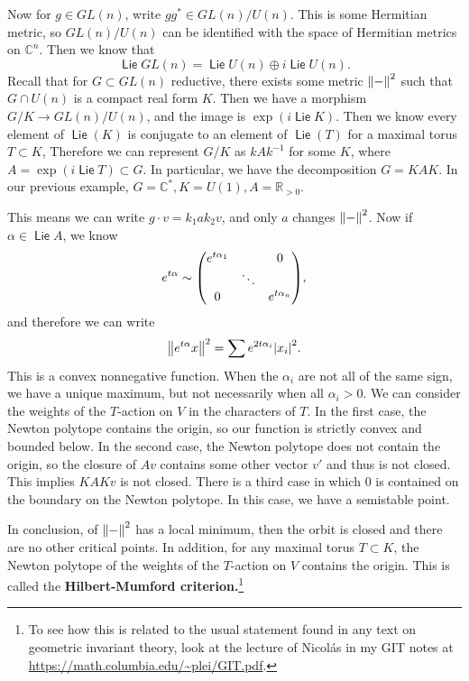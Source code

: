 \documentclass[leqno, openany]{memoir}
\theoremstyle{definition}
\theoremstyle{remark}
\theoremstyle{plain}
\theoremstyle{definition}
\theoremstyle{remark}
\newcommand{\R}{\mathbb{R}}
\newcommand{\C}{\mathbb{C}}
\DeclareMathOperator{\Lie}{\mathsf{Lie}}
\begin{document}
Now for $g \in GL(n)$, write $gg^* \in GL(n)/U(n)$. This is some Hermitian metric, so $GL(n)/U(n)$ can be identified with the space of Hermitian metrics on $\C^n$. Then we know that
\[ \Lie GL(n) = \Lie U(n) \oplus i \Lie U(n). \]
Recall that for $G \subset GL(n)$ reductive, there exists some metric $\norm{-}^2$ such that $G \cap U(n)$ is a compact real form $K$. Then we have a morphism $G/K \to GL(n) / U(n)$, and the image is $\exp (i \Lie K)$. Then we know every element of $\Lie(K)$ is conjugate to an element of $\Lie(T)$ for a maximal torus $T \subset K$, Therefore we can represent $G/K$ as $kAk^{-1}$ for some $K$, where $A = \exp(i \Lie T) \subset G$. In particular, we have the decomposition $G = KAK$. In our previous example, $G = \C^*, K = U(1), A = \R_{>0}$.

This means we can write $g \cdot v = k_1 a k_2 v$, and only $a$ changes $\norm{-}^2$. Now if $\alpha \in \Lie A$, we know 
\[ e^{t \alpha} \sim \mqty( e^{t \alpha_1} & & 0 \\ & \ddots & \\ 0 & & e^{t \alpha_n} ), \]
and therefore we can write
\[ \norm{e^{t \alpha} x}^2 = \sum e^{2 t \alpha_i} \abs{x_i}^2. \]
This is a convex nonnegative function. When the $\alpha_i$ are not all of the same sign, we have a unique maximum, but not necessarily when all $\alpha_i > 0$. We can consider the weights of the $T$-action on $V$ in the characters of $T$. In the first case, the Newton polytope contains the origin, so our function is strictly convex and bounded below. In the second case, the Newton polytope does not contain the origin, so the closure of $Av$ contains some other vector $v'$ and thus is not closed. This implies $KAKv$ is not closed. There is a third case in which $0$ is contained on the boundary on the Newton polytope. In this case, we have a semistable point.

In conclusion, of $\norm{-}^2$ has a local minimum, then the orbit is closed and there are no other critical points. In addition, for any maximal torus $T \subset K$, the Newton polytope of the weights of the $T$-action on $V$ contains the origin. This is called the \textbf{Hilbert-Mumford criterion.}\footnote{To see how this is related to the usual statement found in any text on geometric invariant theory, look at the lecture of Nicol\'as in my GIT notes at \url{https://math.columbia.edu/~plei/GIT.pdf}.} 
\end{document}
